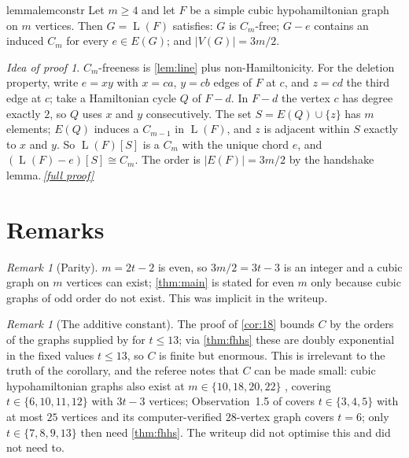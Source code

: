\documentclass[11pt,a4paper]{article}
\theoremstyle{plain}
\theoremstyle{definition}
\theoremstyle{remark}
\newtheorem{remark}[theorem]{Remark}
\newtheorem*{proofidea}{Idea of proof}
\newcommand{\fullproofref}[1]{\,\hyperref[#1]{\textit{[full proof]}}}
\newcommand{\Ln}{\operatorname{L}}
\begin{document}
\begin{restatable}{lemma}{lemconstr}\label{lem:constr}
Let $m\ge4$ and let $F$ be a simple cubic hypohamiltonian graph on $m$ vertices. Then $G=\Ln(F)$ satisfies: $G$ is $C_m$-free; $G-e$ contains an induced $C_m$ for every $e\in E(G)$; and $|V(G)|=3m/2$.
\end{restatable}
\begin{proofidea}
$C_m$-freeness is \cref{lem:line} plus non-Hamiltonicity. For the deletion property, write $e=xy$ with $x=ca$, $y=cb$ edges of $F$ at $c$, and $z=cd$ the third edge at $c$; take a Hamiltonian cycle $Q$ of $F-d$. In $F-d$ the vertex $c$ has degree exactly $2$, so $Q$ uses $x$ and $y$ consecutively. The set $S=E(Q)\cup\{z\}$ has $m$ elements; $E(Q)$ induces a $C_{m-1}$ in $\Ln(F)$, and $z$ is adjacent within $S$ exactly to $x$ and $y$. So $\Ln(F)[S]$ is a $C_m$ with the unique chord $e$, and $(\Ln(F)-e)[S]\cong C_m$. The order is $|E(F)|=3m/2$ by the handshake lemma.\fullproofref{pf:constr}
\end{proofidea}

\section{Remarks}

\begin{remark}[Parity]
$m=2t-2$ is even, so $3m/2=3t-3$ is an integer and a cubic graph on $m$ vertices can exist; \cref{thm:main} is stated for even $m$ only because cubic graphs of odd order do not exist. This was implicit in the writeup.
\end{remark}

\begin{remark}[The additive constant]\label{rem:constant}
The proof of \cref{cor:18} bounds $C$ by the orders of the graphs supplied by \cite{FHHS25} for $t\le13$; via \cref{thm:fhhs} these are doubly exponential in the fixed values $t\le13$, so $C$ is finite but enormous. This is irrelevant to the truth of the corollary, and the referee notes that $C$ can be made small: cubic hypohamiltonian graphs also exist at $m\in\{10,18,20,22\}$ \cite{GZ18}, covering $t\in\{6,10,11,12\}$ with $3t-3$ vertices; Observation~1.5 of \cite{FHHS25} covers $t\in\{3,4,5\}$ with at most $25$ vertices and its computer-verified $28$-vertex graph covers $t=6$; only $t\in\{7,8,9,13\}$ then need \cref{thm:fhhs}. The writeup did not optimise this and did not need to.
\end{remark}
\end{document}
